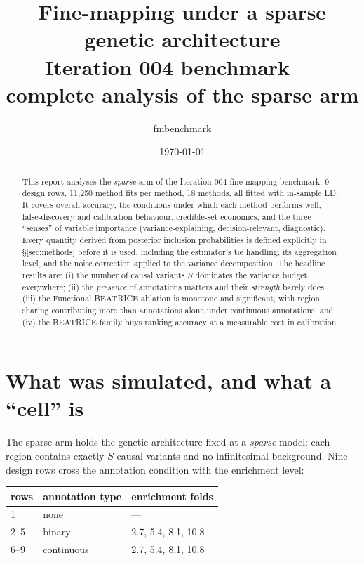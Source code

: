 \documentclass[11pt,a4paper]{article}
\title{\bf Fine-mapping under a sparse genetic architecture\\[2pt]
\large Iteration 004 benchmark --- complete analysis of the sparse arm}
\author{fmbenchmark}
\date{\today}
\begin{document}
\maketitle

\begin{abstract}
\noindent
This report analyses the \emph{sparse} arm of the Iteration 004 fine-mapping
benchmark: 9 design rows, 11{,}250 method fits per method, 18 methods, all
fitted with in-sample LD. It covers overall accuracy, the conditions under
which each method performs well, false-discovery and calibration behaviour,
credible-set economics, and the three ``senses'' of variable importance
(variance-explaining, decision-relevant, diagnostic). Every quantity derived
from posterior inclusion probabilities is defined explicitly in
\S\ref{sec:methods} before it is used, including the estimator's tie handling,
its aggregation level, and the noise correction applied to the variance
decomposition. The headline results are: (i) the number of causal variants $S$
dominates the variance budget everywhere; (ii) the \emph{presence} of
annotations matters and their \emph{strength} barely does; (iii) the
Functional BEATRICE ablation is monotone and significant, with region sharing
contributing more than annotations alone under continuous annotations; and
(iv) the BEATRICE family buys ranking accuracy at a measurable cost in
calibration.
\end{abstract}

\tableofcontents
\bigskip

\section{What was simulated, and what a ``cell'' is}\label{sec:design}

The sparse arm holds the genetic architecture fixed at a \emph{sparse} model:
each region contains exactly $S$ causal variants and no infinitesimal
background. Nine design rows cross the annotation condition with the
enrichment level:

\begin{center}\small
\begin{tabular}{lll}\toprule
rows & annotation type & enrichment folds\\\midrule
1 & none & ---\\
2--5 & binary & 2.7, 5.4, 8.1, 10.8\\
6--9 & continuous & 2.7, 5.4, 8.1, 10.8\\
\bottomrule\end{tabular}\end{center}
\end{document}
